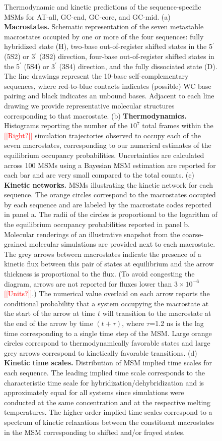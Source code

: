 \documentclass[journal=jpcbfk,manuscript=article]{achemso}
\newcommand*{\rood}[1]{{\color{red}{#1}}}
\newcommand*{\noter}[1]{\textcolor{red}{[[#1]]}}		%
\begin{document}
\begin{figure}[ht!]
        \caption{Thermodynamic and kinetic predictions of the sequence-specific MSMs for AT-all, GC-end, GC-core, and GC-mid. (a) \textbf{Macrostates.} Schematic representation of the seven metastable macrostates occupied by one or more of the four sequences: fully hybridized state (H), two-base out-of-register shifted states in the 5$^\prime$ (5S2) or 3$^\prime$ (3S2) direction, four-base out-of-register shifted states in the 5$^\prime$ (5S4) or 3$^\prime$ (3S4) direction, and the fully dissociated state (D). The line drawings represent the 10-base self-complementary sequences, where red-to-blue contacts indicates (possible) WC base pairing and black indicates an unbound bases. Adjacent to each line drawing we provide representative molecular structures corresponding to that macrostate. (b) \textbf{Thermodynamics.} Histograms reporting the number of the $10^7$ total frames within the \rood{1 ms} \noter{Right?} simulation trajectories observed to occupy each of the seven macrostates, corresponding to our numerical estimates of the equilibrium occupancy probabilities. Uncertainties are calculated across 100 MSMs using a Bayesian MSM estimation are reported for each bar and are very small compared to the total counts. (c) \textbf{Kinetic networks.} MSMs illustrating the kinetic network for each sequence. The orange circles correspond to the macrostates occupied by each sequence and are labeled by the macrostate codes reported in panel a. The radii of the circles is proportional to the logarithm of the equilibrium occupancy probabilities reported in panel b. Molecular renderings of an illustrative snapshot from the coarse-grained molecular simulations are provided next to each macrostate. The grey arrows between macrostates indicate the presence of a kinetic flux between this pair of states at equilibrium and the arrow thickness is proportional to the flux. (To avoid congesting the diagram, arrows are not reported for fluxes lower than $3\times10^{-6}$ \noter{Units?}.) The numerical value overlaid on each arrow reports the conditional probability that a system occupying the macrostate at the start of the arrow at time $t$ will transition to the macrostate at the end of the arrow by time $(t+\tau)$, where $\tau$=1.2 ns is the lag time corresponding to a single time step of the MSM. Large orange circles correspond to thermodynamically favorable states and large grey arrows correspond to kinetically favorable transitions. (d) \textbf{Kinetic time scales.} Distribution of MSM implied time scales for each sequence. The leading implied time scale corresponds to the characteristic time scale for hybridization/dehybridization and is approximately equal for all systems since simulations were conducted at the same concentration and at the respective melting temperatures. The higher order implied time scales correspond to a spectrum of kinetic relaxations between the constituent macrostates in the MSM corresponding to shifted and/or frayed states.
    }
    \label{fig:allseq_table}
\end{figure}
\end{document}
